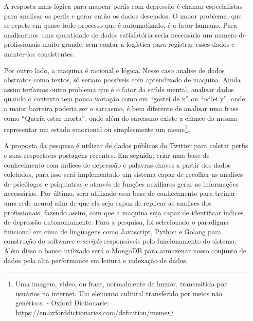 A resposta mais lógica para mapear perfis com depressão é chamar especialistas para analisar os perfis e gerar então os dados desejados. O maior problema, que se repete em quase todo processo que é automatizado, é o fator humano. Para analisarmos uma quantidade de dados satisfatória seria necessário um numero de profissionais muito grande, sem contar a logística para registrar esses dados e manter-los consistentes. 

Por outro lado, a maquina é racional e lógica. Nesse caso analise de dados abstratos como textos, só seriam possíveis com aprendizado de maquina. Ainda assim teríamos outro problema que é o fator da saúde mental, analisar dados quando o contexto tem pouca variação como em “gostei de x” ou “odiei y”, onde a maior barreira poderia ser o sarcasmo, é bem diferente de analisar uma frase como “Queria estar morta”, onde além do sarcasmo existe a chance da mesma representar um estado emocional ou simplesmente um meme\footnote{Uma imagem, video, ou frase, normalmente de humor, transmitida por usuários na internet. Um elemento cultural transferido por meios não genéticos. - Oxford Dictionarie: https://en.oxforddictionaries.com/definition/meme}.

A proposta da pesquisa é utilizar de dados públicos do Twitter para coletar perfis e suas respectivas postagens recentes. Em seguida, criar uma base de conhecimento com índices de depressão e palavras chaves a partir dos dados coletados, para isso será implementado um sistema capaz de recolher as analises de psicólogos e psiquiatras e através de funções auxiliares gerar as informações necessárias. Por último, sera utilizado essa base de conhecimento para treinar uma rede neural afim de que ela seja capaz de replicar as analises dos profissionais, fazendo assim, com que a maquina seja capaz de identificar índices de depressão autonomamente. Para a pesquisa, foi selecionado o paradigma funcional em cima de linguagens como Javascript, Python e Golang para construção do softwares e \textit{scripts} responsáveis pelo funcionamento do sistema. Além disso o banco utilizado será o MongoDB para armazenar nosso conjunto de dados pela alta performance em leitura e indexação de dados.

